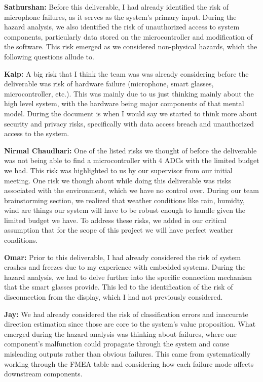 \documentclass{article}
\begin{document}
\begin{enumerate}
    \textbf{Sathurshan:} Before this deliverable, I had already identified the
    risk of microphone failures, as it serves as the system's primary input.
    During the hazard analysis, we also identified the risk of unauthorized
    access to system components, particularly data stored on the microcontroller
    and modification of the software. This risk emerged as we considered
    non-physical hazards, which the following questions allude to.

    \textbf{Kalp:} A big risk that I think the team was was already considering
    before the deliverable was risk of hardware failure (microphone, 
    smart glasses, microcontroller, etc.). This was mainly due to us just 
    thinking mainly about the high level system, with the hardware being major
    components of that mental model. During the document is when I would say we
    started to think more about security and privacy risks, specifically with 
    data access breach and unauthorized access to the system.
    
    \textbf{Nirmal Chaudhari:} One of the listed risks we thought of before 
    the deliverable was not being able to find a microcontroller with 4 ADCs 
    with the limited budget we had. This risk was highlighted to us by our 
    supervisor from our initial meeting. One risk we though about while doing 
    this deliverable was risks associated with the environment, which we have 
    no control over. During our team brainstorming section, we realized that 
    weather conditions like rain, humidty, wind are things our system will 
    have to be robust enough to handle given the limited budget we have. 
    To address these risks, we added in our critical assumption that for the 
    scope of this project we will have perfect weather conditions. 

    \textbf{Omar:} Prior to this deliverable, I had already considered the risk
    of system crashes and freezes due to my experience with embedded systems.
    During the hazard analysis, we had to delve further into the specific 
    connection mechanism that the smart glasses provide. This led to the 
    identification of the risk of disconnection from the display, which I had
    not previously considered.

    \textbf{Jay:} We had already considered the risk of classification errors 
    and inaccurate direction estimation since those are core to the system's 
    value proposition. What emerged during the hazard analysis was thinking 
    about failures, where one component's malfunction could propagate 
    through the system and cause misleading outputs rather than obvious failures. 
    This came from systematically working through the FMEA table and considering 
    how each failure mode affects downstream components.


\end{enumerate}
\end{document}
